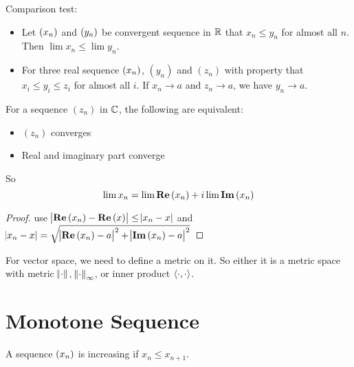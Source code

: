 \begin{theorem}
    Comparison test:
    \begin{itemize}
        \item Let $\sequence{x_n}$ and $\sequence{y_n}$ be convergent sequence in $\mathbb{R}$ that $x_n \leq y_n$ for almost all $n$. Then $\lim x_n \leq \lim y_n$.
        \item For three real sequence $\sequence{x_n}$, $(y_n)$ and $(z_n)$ with property that $x_i \leq y_i \leq z_i$ for almost all $i$. If $x_n \rightarrow a$ and $z_n \rightarrow a$, we have $y_n \rightarrow a$.
    \end{itemize}\end{theorem}

\begin{theorem}
    For a sequence $(z_n)$ in $\mathbb{C}$, the following are equivalent:
    \begin{itemize}
        \item $(z_n)$ converges
        \item Real and imaginary part converge
    \end{itemize}
    
    So 
    \begin{equation}
        \lim x_n = \lim \mathop{\bf Re\/}\text{(}x_n\text{)} + i \lim \mathop{\bf Im\/}\text{(}x_n\text{)}
    \end{equation}
\end{theorem}
\begin{proof}
    use $\abs{\mathop{\bf Re\/}\text{(}x_n\text{)} - \mathop{\bf Re\/}\text{(}x\text{)}} \leq \abs{x_n - x}$ and $\abs{x_n -x} = \sqrt{\abs{\mathop{\bf Re\/}\text{(}x_n\text{)} - a}^2 + \abs{\mathop{\bf Im\/}\text{(}x_n\text{)} - a}^2}$
\end{proof}


For vector space, we need to define a metric on it. So either it is a metric space with metric $\length{\cdot}$, $\length{\cdot}_\infty$, or inner product $\left\langle \displaystyle \cdot, \cdot \right\rangle$.



%
%
%
%

\section{Monotone Sequence}

\begin{definition}
    A sequence $\sequence{x_n}$ is increasing if $x_n \leq x_{n+1}$.
\end{definition}


